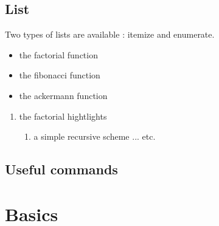 \subsection{List}

Two types of lists are available : itemize and enumerate.

\begin{code}[langague=tango]
\begin{itemize}
\item the factorial function
\item the fibonacci function
\item the ackermann function
\end{itemize}

\begin{enumerate}
\item the factorial hightlights
\begin{enumerate}
\item a simple recursive scheme
... etc.
\end{enumerate}
\end{enumerate}
\end{code}





\subsection{Useful commands}


\section{Basics}
